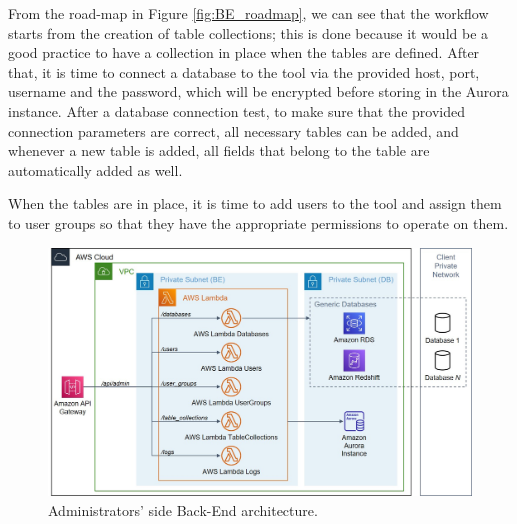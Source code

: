 From the road-map in Figure \ref{fig:BE_roadmap}, we can see that the workflow starts from the creation of table collections; this is done because it would be a good practice to have a collection in place when the tables are defined. After that, it is time to connect a database to the tool via the provided host, port, username and the password, which will be encrypted before storing in the Aurora instance. After a database connection test, to make sure that the provided connection parameters are correct, all necessary tables can be added, and whenever a new table is added, all fields that belong to the table are automatically added as well.

When the tables are in place, it is time to add users to the tool and assign them to user groups so that they have the appropriate permissions to operate on them.

\begin{figure}[!htb]
    \centering
    \includegraphics[width=15.8cm]{chapters/images/ch_3/BE_Admin.jpg}
    \caption{Administrators' side Back-End architecture.}
    \label{fig:BE_Admin}
\end{figure}



